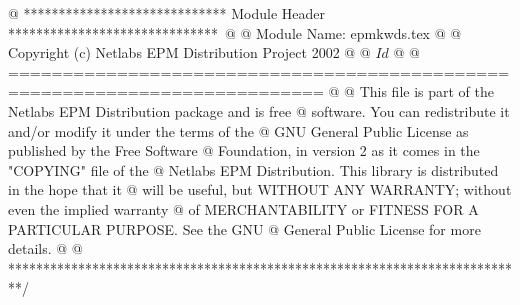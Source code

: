 @ ***************************** Module Header ******************************\
@
@ Module Name: epmkwds.tex
@
@ Copyright (c) Netlabs EPM Distribution Project 2002
@
@ $Id$
@
@ ===========================================================================
@
@ This file is part of the Netlabs EPM Distribution package and is free
@ software.  You can redistribute it and/or modify it under the terms of the
@ GNU General Public License as published by the Free Software
@ Foundation, in version 2 as it comes in the "COPYING" file of the
@ Netlabs EPM Distribution.  This library is distributed in the hope that it
@ will be useful, but WITHOUT ANY WARRANTY; without even the implied warranty
@ of MERCHANTABILITY or FITNESS FOR A PARTICULAR PURPOSE.  See the GNU
@ General Public License for more details.
@
@ **************************************************************************/

